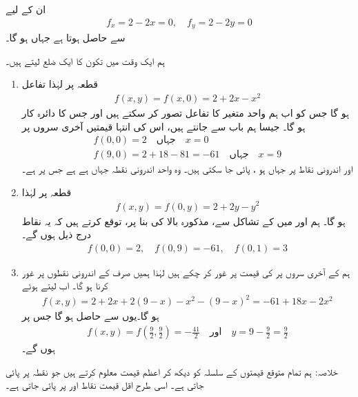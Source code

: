 \quad
ان   کے لیے
\begin{align*}
f_x=2-2x=0,\quad f_y=2-2y=0
\end{align*}
سے   حاصل ہوتا ہے جہاں  ہو گا۔

\quad
ہم  ایک وقت میں تکون کا ایک  ضلع  لیتے ہیں۔
\begin{enumerate}[1.]
\item
قطعہ  پر   لہٰذا تفاعل
\begin{align*}
f(x,y)=f(x,0)=2+2x-x^2
\end{align*}
ہو گا جس کو اب ہم واحد متغیر  کا تفاعل تصور کر سکتے ہیں اور جس کا دائرہ کار  ہو گا۔ جیسا ہم باب  سے جانتے ہیں، اس کی انتہا قیمتیں  آخری سروں پر
\begin{align*}
f(0,0)=2\quad \text{جہاں}\quad x=0\\
f(9,0)=2+18-81=-61\quad \text{جہاں}\quad x=9
\end{align*}
  اور اندرونی نقاط پر جہاں  ہو ، پائی جا سکتی ہیں۔ وہ واحد اندرونی نقطہ جہاں  ہے   ہے جس پر   ہے۔
\item
قطعہ  پر   لہٰذا
\begin{align*}
f(x,y)=f(0,y)=2+2y-y^2
\end{align*}
ہو گا۔ ہم  اور  میں  کے  تشاکل سے، مذکورہ بالا کی بنا پر،  توقع کرتے ہیں کہ یہ نقاط درج ذیل ہوں گے۔
\begin{align*}
f(0,0)=2,\quad f(0,9)=-61,\quad f(0,1)=3
\end{align*} 
\item
ہم  کے آخری  سروں پر  کی قیمت پر غور کر چکے ہیں لہٰذا ہمیں صرف  کے اندرونی نقطوں پر غور کرنا ہو گا۔ اب  لیتے ہوئے
\begin{align*}
f(x,y)=2+2x+2(9-x)-x^2-(9-x)^2=-61+18x-2x^2
\end{align*}
ہو گا۔یوں  سے  حاصل ہو گا جس پر  
\begin{align*}
f(x,y)=f(\frac{9}{2},\frac{9}{2})=-\frac{41}{2}\quad \text{اور}\quad y=9-\frac{9}{2}=\frac{9}{2}
\end{align*}
ہوں گے۔
\end{enumerate}

خلاصہ: ہم تمام متوقع قیمتوں کے سلسلہ  کو  دیکھ کر اعظم قیمت   معلوم کرتے ہیں جو نقطہ  پر پائی جاتی  ہے۔ اسی طرح اقل قیمت  نقاط   اور   پر پائی جاتی ہے۔ 

